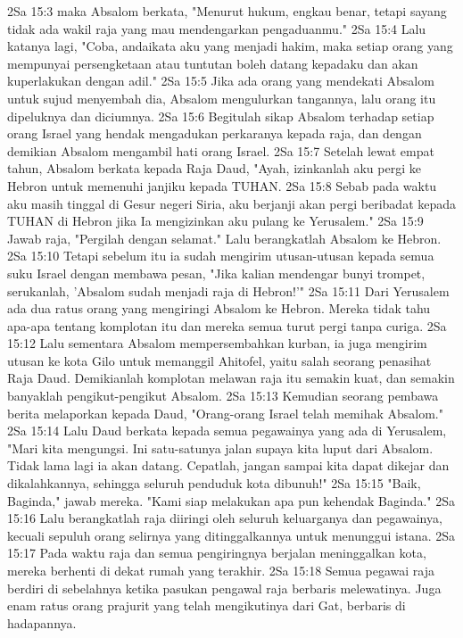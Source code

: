 2Sa 15:3  maka Absalom berkata, "Menurut hukum, engkau benar, tetapi sayang tidak ada wakil raja yang mau mendengarkan pengaduanmu."
2Sa 15:4  Lalu katanya lagi, "Coba, andaikata aku yang menjadi hakim, maka setiap orang yang mempunyai persengketaan atau tuntutan boleh datang kepadaku dan akan kuperlakukan dengan adil."
2Sa 15:5  Jika ada orang yang mendekati Absalom untuk sujud menyembah dia, Absalom mengulurkan tangannya, lalu orang itu dipeluknya dan diciumnya.
2Sa 15:6  Begitulah sikap Absalom terhadap setiap orang Israel yang hendak mengadukan perkaranya kepada raja, dan dengan demikian Absalom mengambil hati orang Israel.
2Sa 15:7  Setelah lewat empat tahun, Absalom berkata kepada Raja Daud, "Ayah, izinkanlah aku pergi ke Hebron untuk memenuhi janjiku kepada TUHAN.
2Sa 15:8  Sebab pada waktu aku masih tinggal di Gesur negeri Siria, aku berjanji akan pergi beribadat kepada TUHAN di Hebron jika Ia mengizinkan aku pulang ke Yerusalem."
2Sa 15:9  Jawab raja, "Pergilah dengan selamat." Lalu berangkatlah Absalom ke Hebron.
2Sa 15:10  Tetapi sebelum itu ia sudah mengirim utusan-utusan kepada semua suku Israel dengan membawa pesan, "Jika kalian mendengar bunyi trompet, serukanlah, 'Absalom sudah menjadi raja di Hebron!'"
2Sa 15:11  Dari Yerusalem ada dua ratus orang yang mengiringi Absalom ke Hebron. Mereka tidak tahu apa-apa tentang komplotan itu dan mereka semua turut pergi tanpa curiga.
2Sa 15:12  Lalu sementara Absalom mempersembahkan kurban, ia juga mengirim utusan ke kota Gilo untuk memanggil Ahitofel, yaitu salah seorang penasihat Raja Daud. Demikianlah komplotan melawan raja itu semakin kuat, dan semakin banyaklah pengikut-pengikut Absalom.
2Sa 15:13  Kemudian seorang pembawa berita melaporkan kepada Daud, "Orang-orang Israel telah memihak Absalom."
2Sa 15:14  Lalu Daud berkata kepada semua pegawainya yang ada di Yerusalem, "Mari kita mengungsi. Ini satu-satunya jalan supaya kita luput dari Absalom. Tidak lama lagi ia akan datang. Cepatlah, jangan sampai kita dapat dikejar dan dikalahkannya, sehingga seluruh penduduk kota dibunuh!"
2Sa 15:15  "Baik, Baginda," jawab mereka. "Kami siap melakukan apa pun kehendak Baginda."
2Sa 15:16  Lalu berangkatlah raja diiringi oleh seluruh keluarganya dan pegawainya, kecuali sepuluh orang selirnya yang ditinggalkannya untuk menunggui istana.
2Sa 15:17  Pada waktu raja dan semua pengiringnya berjalan meninggalkan kota, mereka berhenti di dekat rumah yang terakhir.
2Sa 15:18  Semua pegawai raja berdiri di sebelahnya ketika pasukan pengawal raja berbaris melewatinya. Juga enam ratus orang prajurit yang telah mengikutinya dari Gat, berbaris di hadapannya.
